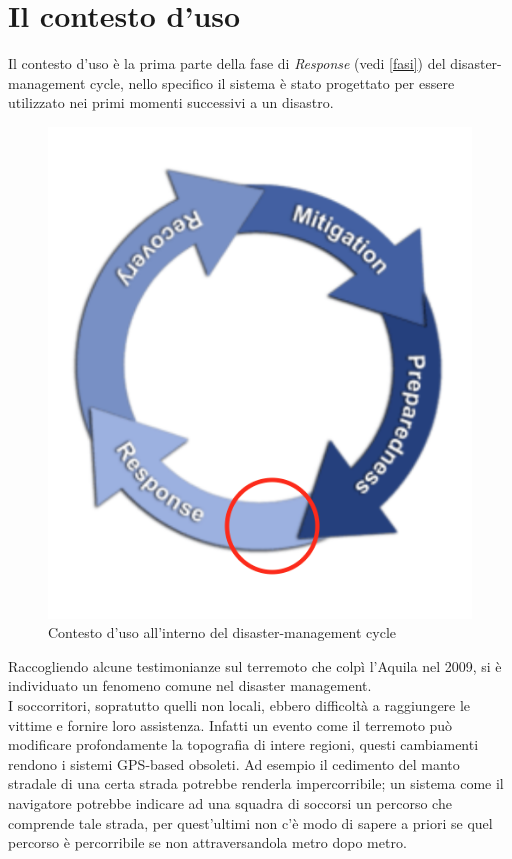 \section{Il contesto d'uso}
\label{contesto}
Il contesto d'uso è la prima parte della fase di \textit{Response }(vedi \ref{fasi}) del disaster-management cycle, nello specifico il sistema è stato progettato per essere utilizzato nei primi momenti successivi a un disastro. \\
\begin{figure}[H]
	\centering
	\includegraphics[scale=0.8]{ScenarioApplicativo/contesto.png}
	\caption{Contesto d'uso all'interno del disaster-management cycle}
	\label{fig:cycle_management}
\end{figure}
 \newpage
Raccogliendo alcune testimonianze sul terremoto che colpì l'Aquila nel 2009, si è individuato un fenomeno comune nel disaster management.\\
I soccorritori, sopratutto quelli non locali, ebbero difficoltà a raggiungere le vittime e fornire loro assistenza. Infatti un evento come il terremoto può modificare profondamente la topografia di intere regioni, questi cambiamenti rendono i sistemi GPS-based obsoleti. Ad esempio il cedimento del manto stradale di una certa strada potrebbe renderla impercorribile; un sistema come il navigatore potrebbe indicare ad una squadra di soccorsi un percorso che comprende tale strada, per quest'ultimi non c'è modo di sapere a priori se quel percorso è percorribile se non attraversandola metro dopo metro. \\
